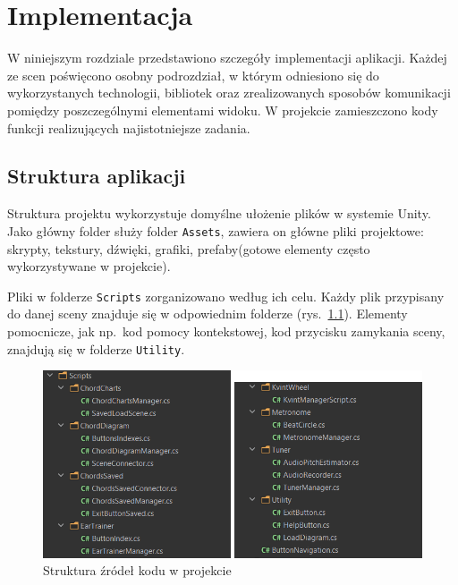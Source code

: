 \chapter{Implementacja}

W niniejszym rozdziale przedstawiono szczegóły implementacji aplikacji. Każdej ze scen poświęcono osobny podrozdział, w którym odniesiono się do wykorzystanych technologii, bibliotek oraz zrealizowanych sposobów komunikacji pomiędzy poszczególnymi elementami widoku. W projekcie zamieszczono kody funkcji realizujących najistotniejsze zadania.

\section{Struktura aplikacji}
Struktura projektu wykorzystuje domyślne ułożenie plików w systemie Unity. Jako główny folder służy folder \texttt{Assets}, zawiera on główne pliki projektowe: skrypty, tekstury, dźwięki, grafiki, prefaby(gotowe elementy często wykorzystywane w projekcie).

Pliki w folderze \texttt{Scripts} zorganizowano według ich celu. Każdy plik przypisany do danej sceny znajduje się w odpowiednim folderze (rys.~\ref{fig:strukturaKodu}). Elementy pomocnicze, jak np.\ kod pomocy kontekstowej, kod przycisku zamykania sceny, znajdują się w folderze \texttt{Utility}. 
 
\begin{figure}[htb]
     \centering
 	\includegraphics[scale=.8]{rys04/StrukturaPlikow}
	\caption{Struktura źródeł kodu w projekcie}
	\label{fig:strukturaKodu}
\end{figure}


